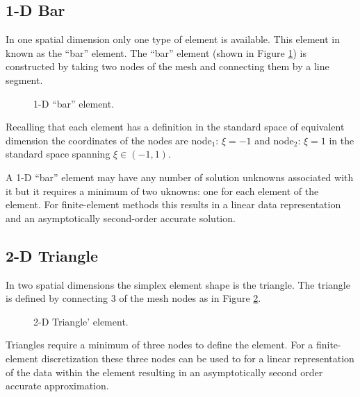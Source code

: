 \documentclass[letterpaper]{article}
\newcommand{\figref}[1]{Figure \ref{#1}}                %
\begin{document}
\subsection{1-D Bar}
In one spatial dimension only one type of element is available.  This element in known as the ``bar'' element.  The ``bar'' element (shown in \figref{fig:c3_line}) is constructed by taking two nodes of the mesh and connecting them by a line segment.  
\begin{figure}[h!]
\centering
{}
\caption{1-D ``bar'' element.}
\label{fig:c3_line}
\end{figure}

Recalling that each element has a definition in the standard space of equivalent dimension the coordinates of the nodes are node$_{1}$: $\xi = -1$ and node$_{2}$: $\xi = 1$ in the standard space spanning $\xi \in (-1,1)$.  

A 1-D ``bar'' element may have any number of solution unknowns associated with it but it requires a minimum of two uknowns: one for each element of the element.  For finite-element methods this results in a linear data representation and an asymptotically second-order accurate solution.  

\subsection{2-D Triangle}
In two spatial dimensions the simplex element shape is the triangle.  The triangle is defined by connecting 3 of the mesh nodes as in \figref{fig:c3_triangle}.  
\begin{figure}
\centering
{}
\caption{2-D Triangle' element.}
\label{fig:c3_triangle}
\end{figure}
Triangles require a minimum of three nodes to define the element.  For a finite-element discretization these three nodes can be used to for a linear representation of the data within the element resulting in an asymptotically second order accurate approximation.   
\end{document}
